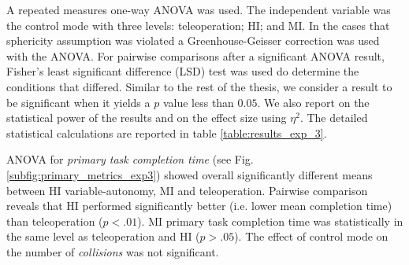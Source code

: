 \documentclass[a4paper,12pt,oneside,openright]{bhamthesis}
\begin{document}
A repeated measures one-way ANOVA was used. The independent variable was the control mode with three levels: teleoperation; HI; and MI. In the cases that sphericity assumption was violated a Greenhouse-Geisser correction was used with the ANOVA. For pairwise comparisons after a significant ANOVA result, Fisher's least significant difference (LSD) test was used do determine the conditions that differed. Similar to the rest of the thesis, we consider a result to be significant when it yields a $p$ value less than $0.05$. We also report on the statistical power of the results and on the effect size using $\eta^2$. The detailed statistical calculations are reported in table \ref{table:results_exp_3}.

ANOVA for \textit{primary task completion time} (see Fig. \ref{subfig:primary_metrics_exp3}) showed overall significantly different means between HI variable-autonomy, MI and teleoperation. Pairwise comparison reveals that HI performed significantly better (i.e. lower mean completion time) than teleoperation (\textit{$p < .01$}). MI primary task completion time was statistically in the same level as teleoperation and HI (\textit{$p > .05$}). The effect of control mode on the number of \textit{collisions} was not significant. 
\end{document}
